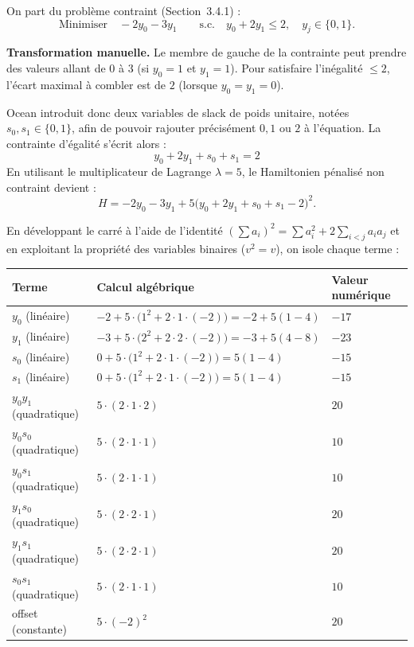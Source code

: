 \documentclass{ceri/sty/rapport}
\begin{document}
\begin{solution}

On part du problème contraint (Section~3.4.1) :
\[
  \text{Minimiser}\quad -2y_0 - 3y_1 \qquad
  \text{s.c.}\quad y_0 + 2y_1 \leq 2,\quad y_j \in \{0,1\}.
\]

\textbf{Transformation manuelle.}
Le membre de gauche de la contrainte peut prendre des valeurs allant de $0$ à $3$ (si $y_0=1$ et $y_1=1$). Pour satisfaire l'inégalité $\leq 2$, l'écart maximal à combler est de $2$ (lorsque $y_0 = y_1 = 0$).

Ocean introduit donc deux variables de slack de poids unitaire, notées $s_0, s_1 \in \{0,1\}$, afin de pouvoir rajouter précisément $0, 1$ ou $2$ à l'équation. La contrainte d'égalité s'écrit alors :
\[
  y_0 + 2y_1 + s_0 + s_1 = 2
\]
En utilisant le multiplicateur de Lagrange $\lambda = 5$, le Hamiltonien pénalisé non contraint devient :
\[
  H = -2y_0 - 3y_1 + 5\bigl(y_0 + 2y_1 + s_0 + s_1 - 2\bigr)^2.
\]

En développant le carré à l'aide de l'identité $\left(\sum a_i\right)^2 = \sum a_i^2 + 2\sum_{i < j} a_i a_j$ et en exploitant la propriété des variables binaires ($v^2 = v$), on isole chaque terme :

\begin{center}
\renewcommand{\arraystretch}{1.3}
\begin{tabular}{lll}
\hline
Terme & Calcul algébrique & Valeur numérique \\
\hline
$y_0$ (linéaire) & $-2 + 5 \cdot \bigl(1^2 + 2 \cdot 1 \cdot (-2)\bigr) = -2 + 5(1 - 4)$ & $-17$ \\
$y_1$ (linéaire) & $-3 + 5 \cdot \bigl(2^2 + 2 \cdot 2 \cdot (-2)\bigr) = -3 + 5(4 - 8)$ & $-23$ \\
$s_0$ (linéaire) & $0 + 5 \cdot \bigl(1^2 + 2 \cdot 1 \cdot (-2)\bigr) = 5(1 - 4)$ & $-15$ \\
$s_1$ (linéaire) & $0 + 5 \cdot \bigl(1^2 + 2 \cdot 1 \cdot (-2)\bigr) = 5(1 - 4)$ & $-15$ \\
$y_0 y_1$ (quadratique) & $5 \cdot (2 \cdot 1 \cdot 2)$ & $20$ \\
$y_0 s_0$ (quadratique) & $5 \cdot (2 \cdot 1 \cdot 1)$ & $10$ \\
$y_0 s_1$ (quadratique) & $5 \cdot (2 \cdot 1 \cdot 1)$ & $10$ \\
$y_1 s_0$ (quadratique) & $5 \cdot (2 \cdot 2 \cdot 1)$ & $20$ \\
$y_1 s_1$ (quadratique) & $5 \cdot (2 \cdot 2 \cdot 1)$ & $20$ \\
$s_0 s_1$ (quadratique) & $5 \cdot (2 \cdot 1 \cdot 1)$ & $10$ \\
offset (constante) & $5 \cdot (-2)^2$ & $20$ \\
\hline
\end{tabular}
\end{center}


\end{solution}
\end{document}
